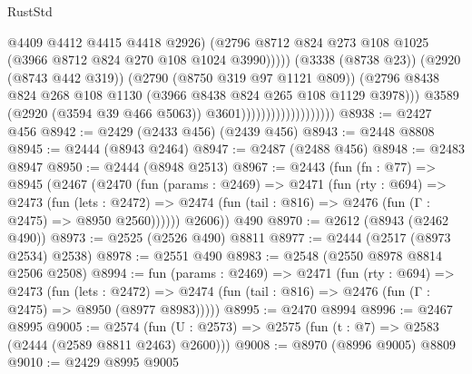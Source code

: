 \begin{lexlean}{RustStd}
\begin{coremodule}
                                                    @4409
                                                    @4412
                                                    @4415
                                                    @4418
                                                    @2926)
                                                  (@2796
                                                    @8712
                                                    @824
                                                    @273
                                                    @108
                                                    @1025
                                                    (@3966 @8712 @824 @270 @108 @1024 @3990)))))
                                            (@3338 (@8738 @23))
                                            (@2920 (@8743 @442 @319))
                                            (@2790 (@8750 @319 @97 @1121 @809))
                                            (@2796
                                              @8438
                                              @824
                                              @268
                                              @108
                                              @1130
                                              (@3966 @8438 @824 @265 @108 @1129 @3978)))
                                          @3589
                                          (@2920 (@3594 @39 @466 @5063))
                                          @3601)))))))))))))))))))
@8938 := @2427 @456
@8942 := @2429 (@2433 @456) (@2439 @456)
@8943 := @2448 @8808
@8945 := @2444 (@8943 @2464)
@8947 := @2487 (@2488 @456)
@8948 := @2483 @8947
@8950 := @2444 (@8948 @2513)
@8967 := @2443
    (fun (fn : @77) =>
    @8945
      (@2467
        (@2470
          (fun (params : @2469) =>
          @2471
            (fun (rty : @694) =>
            @2473
              (fun (lets : @2472) =>
              @2474 (fun (tail : @816) => @2476 (fun (Γ : @2475) => @8950 @2560))))))
        @2606))
    @490
@8970 := @2612 (@8943 (@2462 @490))
@8973 := @2525 (@2526 @490) @8811
@8977 := @2444 (@2517 (@8973 @2534) @2538)
@8978 := @2551 @490
@8983 := @2548 (@2550 @8978 @8814 @2506 @2508)
@8994 := fun (params : @2469) =>
  @2471
    (fun (rty : @694) =>
    @2473
      (fun (lets : @2472) =>
      @2474 (fun (tail : @816) => @2476 (fun (Γ : @2475) => @8950 (@8977 @8983)))))
@8995 := @2470 @8994
@8996 := @2467 @8995
@9005 := @2574 (fun (U : @2573) => @2575 (fun (t : @7) => @2583 (@2444 (@2589 @8811 @2463) @2600)))
@9008 := @8970 (@8996 @9005) @8809
@9010 := @2429 @8995 @9005

\end{coremodule}
\end{lexlean}
